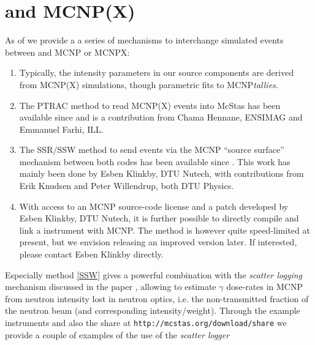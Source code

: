 \section{\MCS and MCNP(X)}
As of  we provide a a series of mechanisms to interchange simulated events
between \MCS and MCNP or MCNPX:
\begin{enumerate}
  \item Typically, the intensity parameters in our \MCS source components are
    derived from MCNP(X) simulations, though parametric fits to MCNP\emph{tallies}.
  \item The PTRAC method to read MCNP(X) events into McStas has been
    available since  and is a contribution from Chama
    Hennane, ENSIMAG and Emmanuel Farhi, ILL.
  \item The SSR/SSW method to send events via the MCNP ``source
    surface'' mechanism between both codes has been available since
    . This work has mainly been done by Esben Klinkby, DTU
    Nutech, with contributions from Erik Knudsen and Peter Willendrup,
    both DTU Physics. \label{SSW}
  \item With access to an MCNP source-code license and a patch
    developed by Esben Klinkby, DTU Nutech, it is further
    possible to directly compile and link a \MCS instrument with
    MCNP. The method is however quite speed-limited at present, but we
    envision releasing an improved version later. If interested,
    please contact Esben Klinkby directly.
\end{enumerate}
Especially method \ref{SSW} gives a powerful combination with the
\emph{scatter logging} mechanism discussed in the paper
\cite{BergbaeckKnudsen201420}, allowing to estimate $\gamma$ dose-rates
in MCNP from neutron intensity lost in neutron optics, i.e. the non-transmitted
fraction of the \MCS neutron beam (and corresponding
intensity/weight). Through the \MCS example instruments and also the \MCS share at
\verb+http://mcstas.org/download/share+ we provide a couple of
examples of the use of the \emph{scatter logger}
